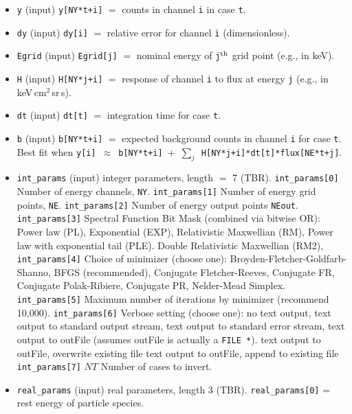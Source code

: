 \documentclass{article}    %
\begin{document}
\begin{itemize}
\item \verb|y| (input) \verb|y[NY*t+i]| $=$ counts in channel \verb|i| in case \verb|t|.
\item \verb|dy| (input) \verb|dy[i]| $=$ relative error for channel \verb|i| (dimensionless).
\item \verb|Egrid| (input) \verb|Egrid[j]| $=$ nominal energy of \verb|j|$^{\rm th}$ grid point (e.g., in keV).
\item \verb|H| (input) \verb|H[NY*j+i]| $=$ response of channel \verb|i| to flux at energy \verb|j| (e.g., in keV\,cm$^2$\,sr\,s).
\item \verb|dt| (input) \verb|dt[t]| $=$ integration time for case \verb|t|.
\item \verb|b| (input) \verb|b[NY*t+i]| $=$ expected background counts in channel \verb|i| for case \verb|t|. Best fit when \verb|y[i]|~$\approx$~\verb|b[NY*t+i]|~+~$\sum_j$~\verb|H[NY*j+i]*dt[t]*flux[NE*t+j]|.
\item \verb|int_params| (input) integer parameters, length $=$ 7 (TBR).
\subitem \verb|int_params[0]| Number of energy channels, \verb|NY|.
\subitem \verb|int_params[1]| Number of energy grid points, \verb|NE|.
\subitem \verb|int_params[2]| Number of energy output points \verb|NEout|.
\subitem \verb|int_params[3]| Spectral Function Bit Mask (combined via bitwise OR):
\subsubitem[1] Power law (PL),
\subsubitem[2] Exponential (EXP),
\subsubitem[4] Relativistic Maxwellian (RM),
\subsubitem[8] Power law with exponential tail (PLE).
\subsubitem[16] Double Relativistic Maxwellian (RM2),
\subitem \verb|int_params[4]| Choice of minimizer (choose one):
\subsubitem[0] Broyden-Fletcher-Goldfarb-Shanno, BFGS (recommended),
\subsubitem[1] Conjugate Fletcher-Reeves, Conjugate FR,
\subsubitem[2] Conjugate Polak-Ribiere, Conjugate PR,
\subsubitem[3] Nelder-Mead Simplex.
\subitem \verb|int_params[5]| Maximum number of iterations by minimizer (recommend 10,000).
\subitem \verb|int_params[6]| Verbose setting (choose one):
\subsubitem[0] no text output,
\subsubitem[1] text output to standard output stream,
\subsubitem[2] text output to standard error stream,
\subsubitem[3] text output to outFile (assumes outFile is actually a \verb|FILE *|).
\subsubitem[4] text output to outFile, overwrite existing file
\subsubitem[5] text output to outFile, append to existing file
\subitem \verb|int_params[7]| $NT$ Number of cases to invert.
\item \verb|real_params| (input) real parameters, length 3 (TBR).
\subitem \verb|real_params[0]| = rest energy of particle species.

\end{itemize}
\end{document}
